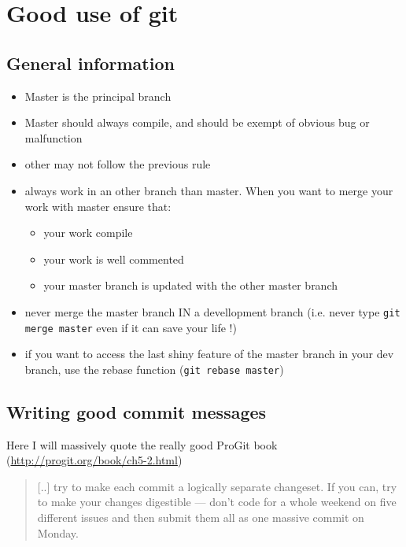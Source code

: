\chapter{Good use of git}

\section{General information}

\begin{itemize}
  \item Master is the principal branch
  \item Master should always compile, and should be exempt of obvious bug or malfunction
  \item other may not follow the previous rule
  \item  always work in an other branch than master. When you want to merge your work with master ensure that:
	 \begin{itemize}
		\item your work compile
		\item your work is well commented
		\item your master branch is updated with the other master branch
	 \end{itemize}
  \item  never merge the master branch IN a devellopment branch (i.e. never type \verb+git merge master+ even if it can save your life !)
  \item  if you want to access the last shiny feature of the master branch in your dev branch, use the rebase function (\verb+git rebase master+)
\end{itemize}

\section{Writing good commit messages}

Here I will massively quote the really good ProGit book (\url{http://progit.org/book/ch5-2.html})

\begin{quote}
  [..] try to make each commit a logically separate changeset. If you can, try to make your changes digestible — don’t code for a whole weekend on five different issues and then submit them all as one massive commit on Monday.
\end{quote}

